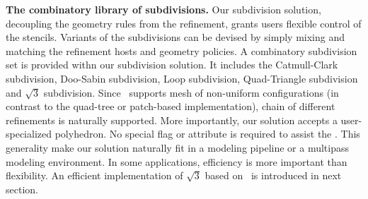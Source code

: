 \noindent\textbf{The combinatory library of subdivisions.}
Our subdivision solution, decoupling the geometry rules from the
refinement, grants users flexible control of the stencils.
Variants of the subdivisions can be devised by simply mixing
and matching the refinement hosts and geometry policies.
A combinatory subdivision set is provided withn our subdivision
solution. It includes the Catmull-Clark subdivision, Doo-Sabin 
subdivision, Loop subdivision, Quad-Triangle subdivision and
$\sqrt{3}$ subdivision. Since
\cgalpoly\ supports mesh of non-uniform configurations 
(in contrast to the quad-tree or patch-based 
implementation), chain of different refinements
is naturally supported.
More importantly, our solution accepts a user-specialized 
polyhedron. No special flag or attribute is required 
to assist the \tr . This generality make our solution 
naturally fit in a modeling pipeline or a multipass modeling 
environment. In some applications, efficiency is more
important than flexibility. An efficient implementation
of $\sqrt{3}$ based on \cgalpoly\ is introduced in next 
section.


 
